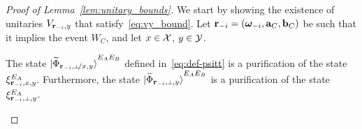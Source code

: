 \begin{proof}[Proof of Lemma~\ref{lem:unitary_bounds}]
We start by showing the existence of unitaries $V_{\mathbf{r}_{-i},y}$ that satisfy~\eqref{eq:vy_bound}. 
Let $\mathbf{r}_{-i} = ({\boldsymbol{\omega}}_{-i},\mathbf{a}_C,\mathbf{b}_C)$ be such that it implies the event $W_C$, and let $x \in \mathcal{X}$, $y \in \mathcal{Y}$. 

\begin{claim}
\label{clm:xi-purification}
The state $\ket{\wt{\Phi}_\sspxy}^{E_A E_B}$ defined in~\eqref{eq:def-psitt} is a purification of the state $\xi_{\mathbf{r}_{-i} , x,y}^{E_A}$. Furthermore, the state $\ket{\wt{\Phi}_\sspy}^{E_A E_B}$ is a purification of the state $\xi_\sspy^{E_A}$. 
\end{claim}


\end{proof}
